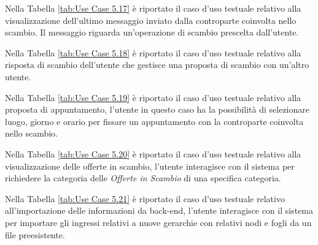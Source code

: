 Nella Tabella \ref{tab:Use Case 5.17} è riportato il caso d'uso testuale relativo alla visualizzazione dell'ultimo messaggio inviato dalla controparte coinvolta nello scambio. Il messaggio riguarda un'operazione di scambio prescelta dall'utente.\bigskip

Nella Tabella \ref{tab:Use Case 5.18} è riportato il caso d'uso testuale relativo alla risposta di scambio dell'utente che gestisce una proposta di scambio con un'altro utente.\bigskip

Nella Tabella \ref{tab:Use Case 5.19} è riportato il caso d'uso testuale relativo alla proposta di appuntamento, l'utente in questo caso ha la possibilità di selezionare luogo, giorno e orario per fissare un appuntamento con la controparte coinvolta nello scambio.\bigskip 

Nella Tabella \ref{tab:Use Case 5.20} è riportato il caso d'uso testuale relativo alla visualizzazione delle offerte in scambio, l'utente interagisce con il sistema per richiedere la categoria delle \textit{Offerte in Scambio} di una specifica categoria.\bigskip

Nella Tabella \ref{tab:Use Case 5.21} è riportato il caso d'uso testuale relativo all'importazione delle informazioni da back-end, l'utente interagisce con il sistema per importare gli ingressi relativi a nuove gerarchie con relativi nodi e fogli da un file preesistente.\bigskip